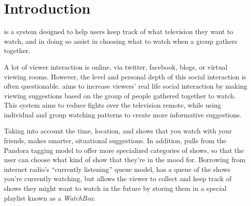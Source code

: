 \section{Introduction}

{\sys} is a system designed to help users keep track of what
television they want to watch, and in doing so assist in choosing what
to watch when a group gathers together.

A lot of viewer interaction is online, via twitter, facebook, blogs,
or virtual viewing rooms.  However, the level and personal depth of
this social interaction is often questionable.  {\sys} aims to
increase viewers' real life social interaction by making viewing
suggestions based on the group of people gathered together to
watch. This system aims to reduce fights over the television remote,
while using individual and group watching patterns to create more
informative suggestions.

Taking into account the time, location, and shows that you watch with
your friends, {\sys} makes smarter, situational suggestions.  In
addition, {\sys} pulls from the Pandora tagging model to offer more
specialized categories of shows, so that the user can choose what kind
of show that they’re in the mood for.  Borrowing from internet radio’s
“currently listening” queue model, {\sys} has a queue of the shows
you’re currently watching, but allows the viewer to collect and keep
track of shows they might want to watch in the future by storing them
in a special playlist known as a \emph{WatchBox}.  
